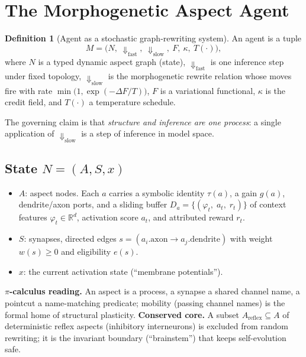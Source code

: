 \documentclass[11pt]{article}
\theoremstyle{definition}
\newtheorem{definition}{Definition}
\newcommand{\R}{\mathbb{R}}
\begin{document}
\section{The Morphogenetic Aspect Agent}
\label{sec:model}

\begin{definition}[Agent as a stochastic graph-rewriting system]
An agent is a tuple
\[
M=\bigl(N,\ \Downarrow_\text{fast},\ \Downarrow_\text{slow},\ F,\ \kappa,\ T(\cdot)\bigr),
\]
where $N$ is a typed dynamic aspect graph (state), $\Downarrow_\text{fast}$
is one inference step under fixed topology, $\Downarrow_\text{slow}$ is the
morphogenetic rewrite relation whose moves fire with rate
$\min\!\bigl(1,\exp(-\Delta F/T)\bigr)$, $F$ is a variational functional,
$\kappa$ is the credit field, and $T(\cdot)$ a temperature schedule.
\end{definition}

The governing claim is that \emph{structure and inference are one process}:
a single application of $\Downarrow_\text{slow}$ is a step of inference in
model space.

\subsection{State $N=(A,S,x)$}
\label{sec:state}
\begin{itemize}[leftmargin=1.4em,itemsep=1pt]
\item $A$: aspect nodes. Each $a$ carries a symbolic identity $\tau(a)$, a
  gain $g(a)$, dendrite/axon ports, and a sliding buffer
  $D_a=\{(\varphi_t,\;a_t,\;r_t)\}$ of context features $\varphi_t\in\R^d$,
  activation score $a_t$, and attributed reward $r_t$.
\item $S$: synapses, directed edges $s=(a_i.\text{axon}\to a_j.\text{dendrite})$
  with weight $w(s)\ge 0$ and eligibility $e(s)$.
\item $x$: the current activation state (``membrane potentials'').
\end{itemize}
\textbf{$\pi$-calculus reading.} An aspect is a process, a synapse a shared
channel name, a pointcut a name-matching predicate; mobility (passing
channel names) is the formal home of structural plasticity.
\textbf{Conserved core.} A subset $A_\text{reflex}\subseteq A$ of
deterministic reflex aspects (inhibitory interneurons) is excluded from
random rewriting; it is the invariant boundary (``brainstem'') that keeps
self-evolution safe.
\end{document}
